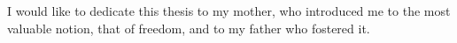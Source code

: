 \begin{dedication}
I would like to dedicate this thesis to my mother, who introduced
me to the most valuable notion, that of freedom, and to my father
who fostered it.\end{dedication}

